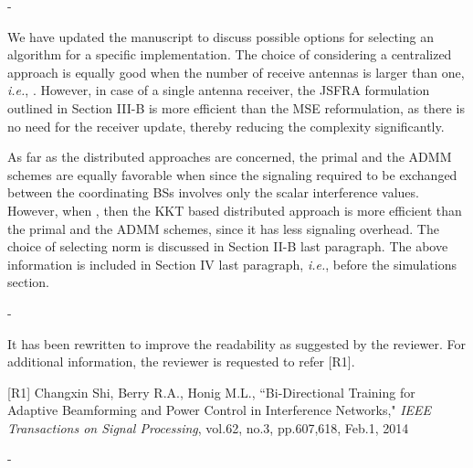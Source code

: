 \begin{enumerate}
\begin{enumerate}
	 - 
	
	\resp We have updated the manuscript to discuss possible options for selecting an algorithm for a specific implementation. The choice of considering a centralized approach is equally good when the number of receive antennas is larger than one, \textit{i.e.}, . However, in case of a single antenna receiver, the \ac{JSFRA} formulation outlined in Section III-B is more efficient than the \ac{MSE} reformulation, as there is no need for the receiver update, thereby reducing the complexity significantly.
	
	As far as the distributed approaches are concerned, the primal and the \ac{ADMM} schemes are equally favorable when  since the signaling required to be exchanged between the coordinating \acp{BS} involves only the scalar interference values. However, when , then the \ac{KKT} based distributed approach is more efficient than the primal and the \ac{ADMM} schemes, since it has less signaling overhead. The choice of selecting  norm is discussed in Section II-B last paragraph. The above information is included in Section IV last paragraph, \textit{i.e.}, before the simulations section.
	
	 - 
	
	\resp It has been rewritten to improve the readability as suggested by the reviewer. For additional information, the reviewer is requested to refer [R1].
	
	[R1] Changxin Shi, Berry R.A., Honig M.L., ``{Bi-Directional Training for Adaptive Beamforming and Power Control in Interference Networks}," \textit{IEEE Transactions on Signal Processing}, vol.62, no.3, pp.607,618, Feb.1, 2014
	
	 - 
	

\end{enumerate}
\end{enumerate}
